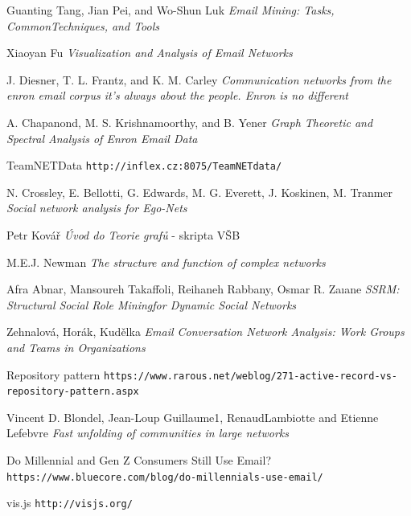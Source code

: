 \documentclass[slovak,master,public,dept460,male,cpdeclaration,oneside]{diploma}
\begin{document}
\newpage
\begin{thebibliography}{99}
	 Guanting Tang, Jian Pei, and Wo-Shun Luk
		\newline
		\textit{Email Mining: Tasks, CommonTechniques, and Tools}
	 
	 Xiaoyan Fu 
		\newline
		\textit{Visualization and Analysis of Email Networks}
	
	 J. Diesner, T. L. Frantz, and K. M. Carley
		\newline
		\textit{Communication networks
from the enron email corpus it’s always about the people. Enron is no different}

	 A. Chapanond, M. S. Krishnamoorthy, and B. Yener 
		\newline
	 	\textit{Graph Theoretic and Spectral Analysis of Enron Email Data }
	
	 TeamNETData
		\newline
		\texttt{http://inflex.cz:8075/TeamNETdata/}
	
	 N. Crossley, E. Bellotti, G. Edwards, M. G. Everett, J. Koskinen, M. Tranmer 
		\newline
	 	\textit{Social network analysis for Ego-Nets}	
	
	 Petr Kovář
		\newline
		\textit{Úvod do Teorie grafů} - skripta VŠB 
	
	 M.E.J. Newman
		\newline
		\textit{The structure and function of complex networks}
	
	 Afra Abnar, Mansoureh Takaffoli, Reihaneh Rabbany, Osmar R. Zaıane 
		\newline
		\textit{SSRM: Structural Social Role Miningfor Dynamic Social Networks}
	
	 Zehnalová, Horák, Kudělka
		\newline
		\textit{Email Conversation Network Analysis: Work Groups and Teams in Organizations}
	
	 Repository pattern 
		\newline
		\texttt{https://www.rarous.net/weblog/271-active-record-vs-repository-pattern.aspx}
	
	 Vincent D. Blondel, Jean-Loup Guillaume1, RenaudLambiotte and Etienne Lefebvre
		\newline
		\textit{Fast unfolding of communities in large networks}
	
	 Do Millennial and Gen Z Consumers Still Use Email? 
		\newline
		\texttt{https://www.bluecore.com/blog/do-millennials-use-email/}
		
	 vis.js
		\newline
		\texttt{http://visjs.org/}
\end{thebibliography}
\end{document}
